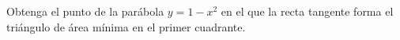 \item Obtenga el punto de la parábola $y = 1 - x^2$ en el que la recta tangente forma el triángulo de área mínima en el primer cuadrante.
